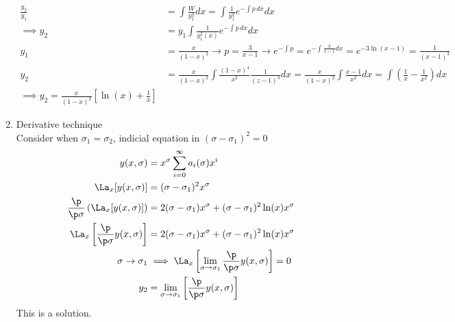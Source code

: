 \documentclass[Maths.tex]{subfiles}
\begin{document}
\begin{example}
\begin{enumerate}
\begin{align}
        \frac{y_2}{y_1} &= \int \frac{W}{y_1^2}dx = \int \frac{1}{y_1^2}e^{-\int p\,dx}dx \\
        \implies y_2 &= y_1\int \frac{1}{y_1^2(x)}e^{-\int p\,dx}dx \\
        y_1 &= \frac{x}{(1-x)^2} \to p = \frac{3}{x-1} \to e^{-\int p} = e^{-\int \frac{3}{x-1}dx} = e^{-3\ln(x-1)} = \frac{1}{(x-1)^3} \\
        y_2 &= \frac{x}{(1-x)^2} \int \frac{(1-x)^4}{x^2} \frac{1}{(z-1)^3}dx = \frac{x}{(1-x)^2}\int \frac{x-1}{x^2}dx = \int \left(\frac{1}{x} - \frac{1}{x^2}\right) dx \\
        \implies y_2 = \frac{x}{(1-x)^2}\left[\ln(x) + \frac{1}{x}\right]
    \end{align}
    \item Derivative technique \\
    Consider when $\sigma_1 = \sigma_2$, indicial equation in $(\sigma - \sigma_1)^2 = 0$
    \begin{align}
        y(x,\sigma) &= x^\sigma \sum_{i=0}^\infty a_i(\sigma)x^i \\
        \La_x[y(x,\sigma)] &= (\sigma - \sigma_1)^2 x^\sigma \\
        \frac{\p}{\p \sigma}\left(\La_x[y(x,\sigma)]\right) &= 2(\sigma-\sigma_1)x^\sigma + (\sigma-\sigma_1)^2\ln(x)x^\sigma \\
        \La_x\left[\frac{\p}{\p \sigma}y(x,\sigma)\right] &=  2(\sigma-\sigma_1)x^\sigma + (\sigma-\sigma_1)^2\ln(x)x^\sigma \\
        \sigma \to \sigma_1 &\implies \La_x\left[\lim_{\sigma\to\sigma_1} \frac{\p}{\p\sigma}y(x,\sigma)\right]= 0 \\
        y_2 &= \lim_{\sigma\to\sigma_1}\left[\frac{\p}{\p\sigma}y(x,\sigma)\right]
    \end{align}
    This is a solution.
\end{enumerate}
\end{example}

\chapter{}
\end{document}
